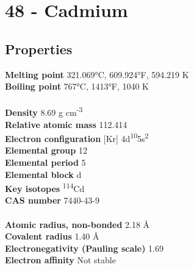 \section{48 - Cadmium}
\label{sec:elem-cadmium}
\subsection{Properties}
\textbf{Melting point} 321.069°C, 609.924°F, 594.219 K\\
\textbf{Boiling point} 767°C, 1413°F, 1040 K\\
\\
\textbf{Density} 8.69 g cm\textsuperscript{-3}\\
\textbf{Relative atomic mass} 112.414\\
\textbf{Electron configuration} [Kr] 4d\textsuperscript{10}5s\textsuperscript{2}\\
\textbf{Elemental group} 12\\
\textbf{Elemental period} 5\\
\textbf{Elemental block} d\\
\textbf{Key isotopes} \textsuperscript{114}Cd\\
\textbf{CAS number} 7440-43-9\\
\\
\textbf{Atomic radius, non-bonded} 2.18 Å\\
\textbf{Covalent radius} 1.40 Å\\
\textbf{Electronegativity (Pauling scale)} 1.69\\
\textbf{Electron affinity} Not stable\\